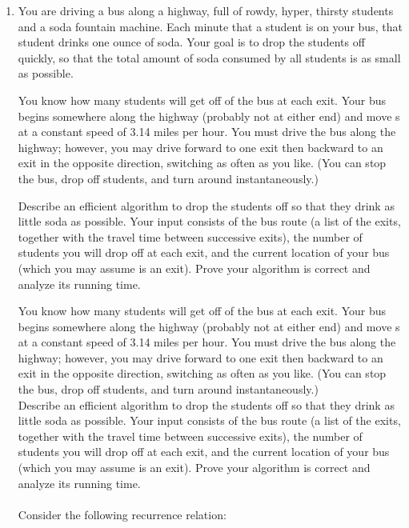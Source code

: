 \documentclass{article}
\newcommand{\question}[1]{\bgroup\color{blue}#1\egroup}
\begin{document}
\begin{enumerate}
\item 
  \question{
You are driving a bus along a highway, full of rowdy, hyper, thirsty students
and a soda fountain machine. Each minute that a student is on your bus, that student drinks one
ounce of soda. Your goal is to drop the students off quickly, so that the total amount of soda
consumed by all students is as small as possible.

You know how many students will get off of the bus at each exit. Your bus begins somewhere
along the highway (probably not at either end) and move s at a constant speed of 3.14 miles per
hour. You must drive the bus along the highway; however, you may drive forward to one exit then
backward to an exit in the opposite direction, switching as often as you like. (You can stop the
bus, drop off students, and turn around instantaneously.)

Describe an efficient algorithm to drop the students off so that they drink as little soda as
possible. Your input consists of the bus route (a list of the exits, together with the travel time
between successive exits), the number of students you will drop off at each exit, and the current
location of your bus (which you may assume is an exit). Prove your algorithm is correct and analyze
its running time.
}

You know how many students will get off of the bus at each exit. Your bus begins somewhere along the highway (probably not at either end) and move s at a constant speed of 3.14 miles per hour. You must drive the bus along the highway; however, you may drive forward to one exit then backward to an exit in the opposite direction, switching as often as you like. (You can stop the bus, drop off students, and turn around instantaneously.)\\

Describe an efficient algorithm to drop the students off so that they drink as little soda as possible. Your input consists of the bus route (a list of the exits, together with the travel time between successive exits), the number of students you will drop off at each exit, and the current location of your bus (which you may assume is an exit). Prove your algorithm is correct and analyze its running time.\\
\\
Consider the following recurrence relation:\\


\end{enumerate}
\end{document}
